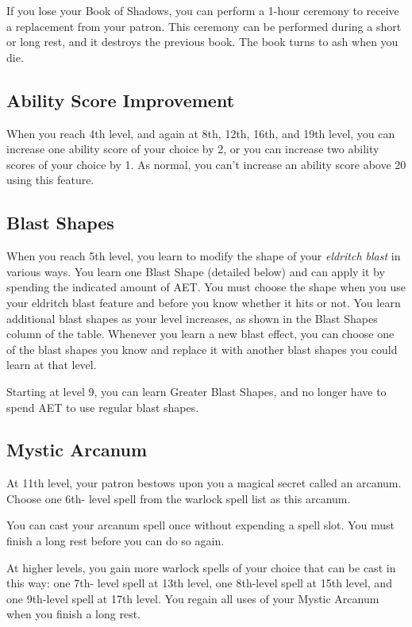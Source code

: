 If you lose your Book of Shadows, you can perform a 1-hour ceremony to receive a replacement from your patron. This ceremony can be performed during a short or long rest, and it destroys the previous book. The book turns to ash when you die.

\subsection{Ability Score Improvement}

When you reach 4th level, and again at 8th, 12th, 16th, and 19th level, you can increase one ability score of your choice by 2, or you can increase two ability scores of your choice by 1. As normal, you can't increase an ability score above 20 using this feature.

\subsection{Blast Shapes}

When you reach 5th level, you learn to modify the shape of your \textit{eldritch blast} in various ways. You learn one Blast Shape (detailed below) and can apply it by spending the indicated amount of AET. You must choose the shape when you use your eldritch blast feature and before you know whether it hits or not. You learn additional blast shapes as your level increases, as shown in the Blast Shapes column of the  table. Whenever you learn a new blast effect, you can choose one of the blast shapes you know and replace it with another blast shapes you could learn at that level.

Starting at level 9, you can learn Greater Blast Shapes, and no longer have to spend AET to use regular blast shapes. 

\subsection{Mystic Arcanum}

At 11th level, your patron bestows upon you a magical secret called an arcanum. Choose one 6th- level spell from the warlock spell list as this arcanum.

You can cast your arcanum spell once without expending a spell slot. You must finish a long rest before you can do so again.

At higher levels, you gain more warlock spells of your choice that can be cast in this way: one 7th- level spell at 13th level, one 8th-level spell at 15th level, and one 9th-level spell at 17th level. You regain all uses of your Mystic Arcanum when you finish a long rest.

